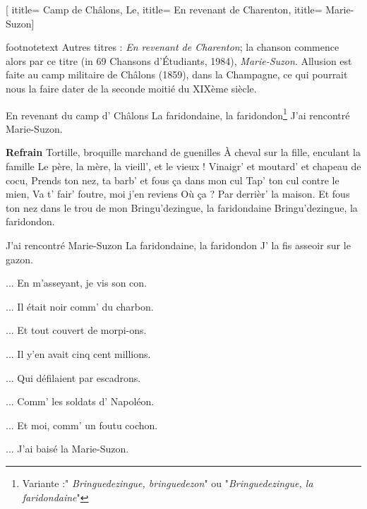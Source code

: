  [
ititle= {Camp de Châlons, Le},
ititle= {En revenant de Charenton},
ititle= {Marie-Suzon}]

footnotetext {Autres titres : \emph{En revenant de Charenton}; la chanson commence alors par ce titre (in 69 Chansons d'Étudiants, 1984), \emph{Marie-Suzon}. Allusion est faite au camp militaire de Châlons (1859), dans la Champagne, ce qui pourrait nous la faire dater de la seconde moitié du XIXème siècle.}

\beginverse
En revenant du camp d' Châlons
La faridondaine, la faridondon\footnote { Variante :" \emph{Bringuedezingue, bringuedezon}" ou "\emph{Bringuedezingue, la faridondaine}"}
J'ai rencontré Marie-Suzon.
\endverse

\beginchorus
\textbf {Refrain}
Tortille, broquille marchand de guenilles
À cheval sur la fille, enculant la famille
Le père, la mère, la vieill', et le vieux !
Vinaigr' et moutard' et chapeau de cocu,
Prends ton nez, ta barb' et fous ça dans mon cul
Tap' ton cul contre le mien,
Va t' fair' foutre, moi j'en reviens
Où ça ?
Par derrièr' la maison.
Et fous ton nez dans le trou de mon
Bringu'dezingue, la faridondaine
Bringu'dezingue, la faridondon.
\endchorus

\beginverse
J'ai rencontré Marie-Suzon
La faridondaine, la faridondon
J' la fis asseoir sur le gazon.
\endverse

\beginverse
... En m'asseyant, je vis son con.
\endverse

\beginverse
... Il était noir comm' du charbon.
\endverse

\beginverse
... Et tout couvert de morpi-ons.
\endverse

\beginverse
... Il y'en avait cinq cent millions.
\endverse

\beginverse
... Qui défilaient par escadrons.
\endverse

\beginverse
... Comm' les soldats d' Napoléon.
\endverse

\beginverse
... Et moi, comm' un foutu cochon.
\endverse

\beginverse
... J'ai baisé la Marie-Suzon.
\endverse

\endsong